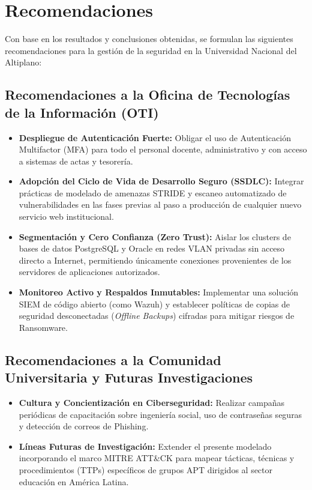 \chapter{Recomendaciones}
\label{ch:recomendaciones}

Con base en los resultados y conclusiones obtenidas, se formulan las siguientes recomendaciones para la gestión de la seguridad en la Universidad Nacional del Altiplano:

\section{Recomendaciones a la Oficina de Tecnologías de la Información (OTI)}
\begin{itemize}
    \item \textbf{Despliegue de Autenticación Fuerte:} Obligar el uso de Autenticación Multifactor (MFA) para todo el personal docente, administrativo y con acceso a sistemas de actas y tesorería.
    \item \textbf{Adopción del Ciclo de Vida de Desarrollo Seguro (SSDLC):} Integrar prácticas de modelado de amenazas STRIDE y escaneo automatizado de vulnerabilidades en las fases previas al paso a producción de cualquier nuevo servicio web institucional.
    \item \textbf{Segmentación y Cero Confianza (Zero Trust):} Aislar los clusters de bases de datos PostgreSQL y Oracle en redes VLAN privadas sin acceso directo a Internet, permitiendo únicamente conexiones provenientes de los servidores de aplicaciones autorizados.
    \item \textbf{Monitoreo Activo y Respaldos Inmutables:} Implementar una solución SIEM de código abierto (como Wazuh) y establecer políticas de copias de seguridad desconectadas (\textit{Offline Backups}) cifradas para mitigar riesgos de Ransomware.
\end{itemize}

\section{Recomendaciones a la Comunidad Universitaria y Futuras Investigaciones}
\begin{itemize}
    \item \textbf{Cultura y Concientización en Ciberseguridad:} Realizar campañas periódicas de capacitación sobre ingeniería social, uso de contraseñas seguras y detección de correos de Phishing.
    \item \textbf{Líneas Futuras de Investigación:} Extender el presente modelado incorporando el marco MITRE ATT\&CK para mapear tácticas, técnicas y procedimientos (TTPs) específicos de grupos APT dirigidos al sector educación en América Latina.
\end{itemize}
